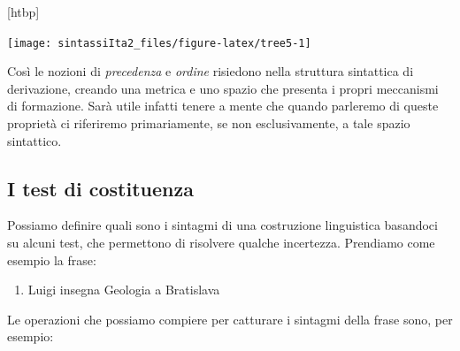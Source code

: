 \documentclass[a4paper,twoside,11pt,chapterprefix=false,bibliography=totocnumbered,listof=flat]{scrbook}
\makeatletter
\providecommand{\tightlist}{%
  \setlength{\itemsep}{0pt}\setlength{\parskip}{0pt}}
\def\fps@figure{htbp}
\renewenvironment{figure}[1][\fps@figure]{
  \edef\@tempa{\noexpand\@float{figure}[#1]} 
  \@tempa
  \sffamily
}{
  \end@float
}
\makeatother
\begin{document}
\begin{figure}

{\centering \texttt{[image: sintassiIta2\_files/figure-latex/tree5-1]} 

}

\caption{Una semplice derivazione sintattica}\label{fig:tree5}
\end{figure}

Così le nozioni di \emph{precedenza} e \emph{ordine} risiedono nella struttura sintattica di derivazione, creando una metrica e uno spazio che presenta i propri meccanismi di formazione. Sarà utile infatti tenere a mente che quando parleremo di queste proprietà ci riferiremo primariamente, se non esclusivamente, a tale spazio sintattico.

\hypertarget{i-test-di-costituenza}{%
\subsection{I test di costituenza}\label{i-test-di-costituenza}}

Possiamo definire quali sono i sintagmi di una costruzione linguistica basandoci su alcuni test, che permettono di risolvere qualche incertezza. Prendiamo come esempio la frase:

\begin{enumerate}
\def\labelenumi{(\arabic{enumi})}
\setcounter{enumi}{10}
\tightlist
\item
  Luigi insegna Geologia a Bratislava
\end{enumerate}

Le operazioni che possiamo compiere per catturare i sintagmi della frase sono, per esempio:
\end{document}
